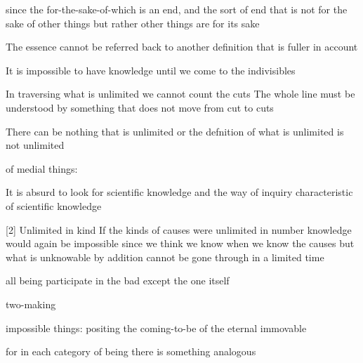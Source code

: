 since the for-the-sake-of-which is an end,
and the sort of end that is not for the sake of other things
but rather other things are for its sake


The essence cannot be referred back to another definition
that is fuller in account

It is impossible to have knowledge until we come to the indivisibles

In traversing what is unlimited we cannot count the cuts
The whole line must be understood by something that does not move from cut to cuts

There can be nothing that is unlimited
or the defnition of what is unlimited is not unlimited


of medial things:

It is absurd to look for scientific knowledge 
and the way of inquiry characteristic of scientific knowledge

[2] Unlimited in kind
If the kinds of causes were unlimited in number
knowledge would again be impossible
since we think we know when we know the causes
but what is unknowable by addition cannot be gone through in a limited time


all being participate in the bad except the one itself

two-making

impossible things:
positing the coming-to-be of the eternal
immovable

for in each category of being there is something analogous

